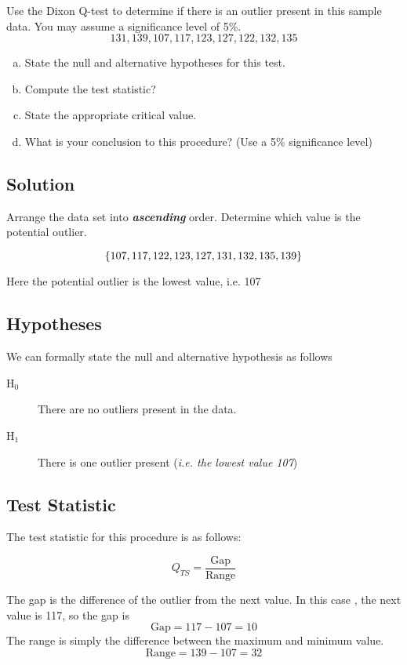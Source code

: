 \documentclass[a4paper,12pt]{article}
\begin{document}
\large 

\noindent Use the Dixon Q-test to determine if there is an outlier present in this sample data. You may assume
a significance level of 5\%.
\[ 131, 139, 107, 117, 123, 127, 122, 132, 135\]
\begin{enumerate}[(a)]
\item  State the null and alternative hypotheses for this test.
\item  Compute the test statistic?
\item  State the appropriate critical value.
\item  What is your conclusion to this procedure? (Use a 5\% significance level)
\end{enumerate}



\subsection*{Solution}
Arrange the data set into \textbf{\textit{ascending}} order. Determine which value is the potential outlier.

\[\LARGE \{ 107, 117, 122, 123, 127, 131, 132, 135, 139\} \]

\noindent Here the potential outlier is the lowest value, i.e. 107

\subsection*{Hypotheses}

We can formally state the null and alternative hypothesis as follows

\begin{description}
\item[H$_0$] There are no outliers present in the data.
\item[H$_1$] There is one outlier present (\textit{i.e. the lowest value 107})
\end{description}

\subsection*{Test Statistic}

The test statistic for this procedure is as follows:

\[ Q_{TS} =  \frac{\mbox{Gap}}{\mbox{Range}} \]

\noindent The gap is the difference of the outlier from the next value. In this case , the next value is 117, so the gap is 
\[ \mbox{Gap} = 117 - 107 = 10\]
The range is simply the difference between the maximum and minimum value.
\[ \mbox{Range} =  139-107 =32\]
\end{document}

